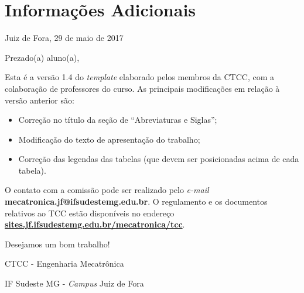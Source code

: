 \chapter{Informações Adicionais}

\begin{flushright}
Juiz de Fora, 29 de maio de 2017
\end{flushright}

Prezado(a) aluno(a), 

Esta é a versão 1.4 do \emph{template} elaborado pelos membros da \ac{CTCC}, com a colaboração de professores do curso. As principais modificações em relação à versão anterior são:
\begin{itemize}
	\item Correção no título da seção de ``Abreviaturas e Siglas'';
	\item Modificação do texto de apresentação do trabalho;
	\item Correção das legendas das tabelas (que devem ser posicionadas acima de cada tabela).
\end{itemize}

O contato com a comissão pode ser realizado pelo \emph{e-mail} \textbf{mecatronica.jf@ifsudestemg.edu.br}. O regulamento e os documentos relativos ao \ac{TCC} estão disponíveis no endereço 
\hyperlink{sites.jf.ifsudestemg.edu.br/mecatronica/tcc}{\textbf{sites.jf.ifsudestemg.edu.br/mecatronica/tcc}}.

Desejamos um bom trabalho!

\vspace*{4\baselineskip}
\begin{center}
CTCC - Engenharia Mecatrônica

IF Sudeste MG - \emph{Campus} Juiz de Fora
\end{center}




